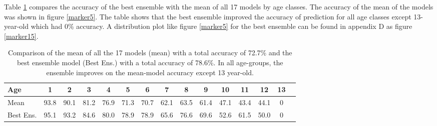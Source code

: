 \documentclass[10pt,letterpaper]{article}
\begin{document}
Table \ref{table9} compares the accuracy of the best ensemble with the mean of all 17 models by age classes. The accuracy of the mean of the models was shown in figure \ref{marker5}. The table shows that the best ensemble improved the accuracy of prediction for all age classes except 13-year-old which had 0\% accuracy.
A distribution plot like figure \ref{marker5} for the best ensemble can be found in appendix D as figure \ref{marker15}.

\begin{center}
\begin{table}[hbt!]
\caption{Comparison of the mean of all the 17 models (mean) with a total accuracy of 72.7\% and 
the best ensemble model (Best Ens.) with a total accuracy of 78.6\%. In all age-groups, the
ensemble improves on the mean-model accuracy except 13 year-old.}
\setlength\tabcolsep{3.5pt} %
\begin{tabular}{ |l|c|c|c|c|c|c|c|c|c|c|c|c|c|c| }
\hline
Age        & 1    & 2    & 3    & 4    & 5    & 6    & 7    &  8   & 9  & 10   & 11   & 12   & 13   \\ \hline
Mean       & 93.8 & 90.1 & 81.2 & 76.9 & 71.3 & 70.7 & 62.1 & 63.5 & 61.4 & 47.1 & 43.4 & 44.1 & 0 \\ 
Best Ens.  & 95.1 & 93.2 & 84.6 & 80.0 & 78.9 & 78.9 & 65.6 & 76.6 & 69.6 & 52.6 & 61.5 & 50.0 & 0 \\ \hline
\end{tabular}
\label{table9}
\end{table}
\end{center}

\end{document}
